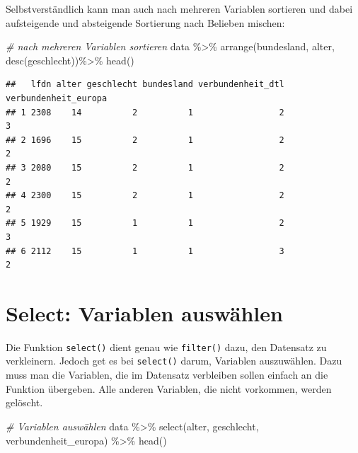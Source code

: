 \documentclass[
]{book}
\newenvironment{Shaded}{\begin{snugshade}}{\end{snugshade}}
\newcommand{\CommentTok}[1]{\textcolor[rgb]{0.56,0.35,0.01}{\textit{#1}}}
\newcommand{\FunctionTok}[1]{\textcolor[rgb]{0.00,0.00,0.00}{#1}}
\newcommand{\NormalTok}[1]{#1}
\newcommand{\SpecialCharTok}[1]{\textcolor[rgb]{0.00,0.00,0.00}{#1}}
\begin{document}
Selbstverständlich kann man auch nach mehreren Variablen sortieren und dabei aufsteigende und absteigende Sortierung nach Belieben mischen:

\begin{Shaded}
\begin{Highlighting}[]
\CommentTok{\# nach mehreren Variablen sortieren}
\NormalTok{data }\SpecialCharTok{\%\textgreater{}\%} 
  \FunctionTok{arrange}\NormalTok{(bundesland, alter, }\FunctionTok{desc}\NormalTok{(geschlecht))}\SpecialCharTok{\%\textgreater{}\%} 
  \FunctionTok{head}\NormalTok{()}
\end{Highlighting}
\end{Shaded}

\begin{verbatim}
##   lfdn alter geschlecht bundesland verbundenheit_dtl verbundenheit_europa
## 1 2308    14          2          1                 2                    3
## 2 1696    15          2          1                 2                    2
## 3 2080    15          2          1                 2                    2
## 4 2300    15          2          1                 2                    2
## 5 1929    15          1          1                 2                    3
## 6 2112    15          1          1                 3                    2
\end{verbatim}

\hypertarget{select-variablen-auswuxe4hlen}{%
\section{Select: Variablen auswählen}\label{select-variablen-auswuxe4hlen}}

Die Funktion \texttt{select()} dient genau wie \texttt{filter()} dazu, den Datensatz zu verkleinern. Jedoch get es bei \texttt{select()} darum, Variablen auszuwählen. Dazu muss man die Variablen, die im Datensatz verbleiben sollen einfach an die Funktion übergeben. Alle anderen Variablen, die nicht vorkommen, werden gelöscht.

\begin{Shaded}
\begin{Highlighting}[]
\CommentTok{\# Variablen auswählen}
\NormalTok{data }\SpecialCharTok{\%\textgreater{}\%} 
  \FunctionTok{select}\NormalTok{(alter, geschlecht, verbundenheit\_europa) }\SpecialCharTok{\%\textgreater{}\%} 
  \FunctionTok{head}\NormalTok{()}
\end{Highlighting}
\end{Shaded}
\end{document}
